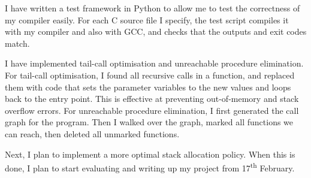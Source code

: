 \documentclass[12pt, a4paper]{article}
\begin{document}
I have written a test framework in Python to allow me to test the correctness of my compiler easily.
For each C source file I specify, the test script compiles it with my compiler and also with GCC, and checks that the outputs and exit codes match.

I have implemented tail-call optimisation and unreachable procedure elimination.
For tail-call optimisation, I found all recursive calls in a function, and replaced them with code that sets the parameter variables to the new values and loops back to the entry point.
This is effective at preventing out-of-memory and stack overflow errors.
For unreachable procedure elimination, I first generated the call graph for the program. Then I walked over the graph, marked all functions we can reach, then deleted all unmarked functions.

Next, I plan to implement a more optimal stack allocation policy.
When this is done, I plan to start evaluating and writing up my project from 17\textsuperscript{th} February.

\printbibliography
\end{document}
